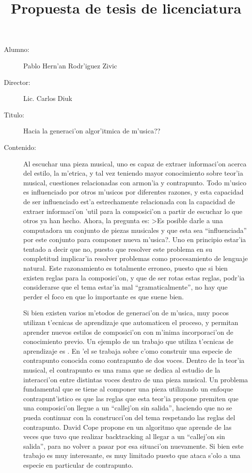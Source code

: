 \documentclass[a4paper,10pt]{article}
\title{Propuesta de tesis de licenciatura}
\begin{document}
\maketitle
 \begin{description}
  \item[Alumno:] Pablo Hern'an Rodr'iguez Zivic
  \item[Director:] Lic. Carlos Diuk
  \item[Titulo:] Hacia la generaci'on algor'itmica de m'usica??
  \item[Contenido:] Al escuchar una pieza musical, uno es capaz de extraer informaci'on acerca del 
	estilo, la m'etrica, y tal vez teniendo mayor conocimiento sobre teor'ia musical, cuestiones relacionadas 
	con armon'ia y contrapunto. Todo m'usico es influenciado por otros m'usicos por diferentes razones, 
	y esta capacidad de ser influenciado est'a estrechamente relacionada con la capacidad de extraer 
	informaci'on 'util para la composici'on a partir de escuchar lo que otros ya han hecho.
	Ahora, la pregunta es: >Es posible darle a una computadora un conjunto de piezas musicales y que esta sea 
	``influenciada'' por este conjunto para componer nueva m'usica?. Uno en principio estar'ia tentado a 
	decir que no, puesto que resolver este problema en su completitud implicar'ia
	resolver problemas como procesamiento de lenguaje natural. Este razonamiento es totalmente
	erroneo, puesto que si bien existen reglas para la composici'on, y que de ser rotas estas reglas,
	podr'ia considerarse que el tema estar'ia mal ``gramaticalmente'', no hay que perder el foco en que lo
	importante es que suene bien.
	

	Si bien existen varios m'etodos de generaci'on de m'usica, muy pocos utilizan t'ecnicas de aprendizaje 
	que automaticen el proceso, y permitan aprender nuevos estilos de composici'on con m'inima
	incorporaci'on de conocimiento previo. Un ejemplo de un trabajo que utiliza t'ecnicas de aprendizaje es 
	\cite{DaCo}. En 'el se trabaja sobre c'omo construir una especie de contrapunto conocida como contrapunto 
	de dos voces. Dentro de la teor'ia musical, el contrapunto es una rama que se dedica al estudio de la 
	interacci'on entre distintas voces dentro de una pieza musical. Un problema fundamental que se tiene 
	al componer una pieza utilizando un enfoque contrapunt'istico es que las reglas que esta teor'ia propone 
	premiten que una composici'on llegue a un ``callej'on sin salida'', haciendo que no se pueda continuar 
	con la construcci'on del tema respetando las reglas del contrapunto. David Cope propone en \cite{DaCo} 
	un algoritmo que aprende de las veces que tuvo que realizar backtracking al llegar a un ``callej'on sin 
	salida'', para no volver a pasar por esa situaci'on nuevamente. Si bien este trabajo es muy
	interesante, es muy limitado puesto que ataca s'olo a una especie en particular de contrapunto.
	 

\end{description}
\end{document}
